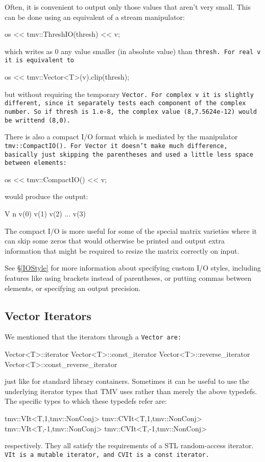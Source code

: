 Often, it is convenient to output only those values that aren't very small. 
This can be done using an equivalent of a stream manipulator:
\begin{tmvcode}
os << tmv::ThreshIO(thresh) << v;
\end{tmvcode}
which writes as 0 any value smaller (in absolute value) than \tt{thresh}.  
For real \tt{v} it is equivalent to
\begin{tmvcode}
os << tmv::Vector<T>(v).clip(thresh);
\end{tmvcode}
but without requiring the temporary \tt{Vector}.  For complex \tt{v} it is slightly different, since it separately tests each component of the complex number.  So if \tt{thresh} is \tt{1.e-8}, the complex value \tt{(8,7.5624e-12)} would be writtend \tt{(8,0)}.

There is also a compact I/O format which is mediated by the manipulator
\tt{tmv::CompactIO()}.  For \tt{Vector} it doesn't make much difference, basically
just skipping the parentheses and used a little less space between elements:
\begin{tmvcode}
os << tmv::CompactIO() << v;
\end{tmvcode}
would produce the output:
\begin{tmvcode}
V n v(0) v(1) v(2) ... v(3)
\end{tmvcode}
The compact I/O is more useful for some of the special matrix varieties where it can skip 
some zeros that would otherwise be printed and output extra information that might be required
to resize the matrix correctly on input.

See \S\ref{IOStyle} for more information about specifying custom I/O styles, including
features like using brackets instead of parentheses, or putting commas between elements,
or specifying an output precision.  

\subsection{Vector Iterators}
\label{VectorIterators}

We mentioned that the iterators through a \tt{Vector} are:
\begin{tmvcode}
Vector<T>::iterator
Vector<T>::const_iterator
Vector<T>::reverse_iterator
Vector<T>::const_reverse_iterator
\end{tmvcode}
just like for standard library containers.  Sometimes it can be useful to use the underlying iterator types that TMV uses rather than merely the above typedefs.  The specific types to which these
typedefs refer are:
\begin{tmvcode}
tmv::VIt<T,1,tmv::NonConj>
tmv::CVIt<T,1,tmv::NonConj>
tmv::VIt<T,-1,tmv::NonConj>
tmv::CVIt<T,-1,tmv::NonConj>
\end{tmvcode}
respectively.  They all satisfy the requirements of a STL random-access iterator.
\tt{VIt} is a mutable iterator, and \tt{CVIt} is a const iterator.

